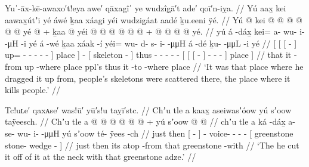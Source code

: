 \ex\label{ex:91-174-skeletons-scattered}%
%
\begingl
	\glpreamble	Yuˈ-āx-kē-awaxo′t!eya awe′ qāxagîˈ ye wudzîg̣ā′t ade′ qoī′n-iỵa. //
	\glpreamble	Yú aax̱ kei aawax̱útʼi yé áwé ḵaa xáagi yéi wudzig̱áat aadé ḵu.eeni ÿé. //
	\gla	{} Yú {} {}  @ {} {}
			kei @  @ {} @ {} @ {} @ {} @ {} {}
			yé {}  @ {} +
		{} ḵaa  @ {} {}
		yéi @  @ {} @ {} @ {} @ {} @ {} +
		{} {} {}  @ {} {}
			 @ {} @ {} @ {} {} yé. {} //
	\glb	{} yú {} {} á -dáx̱ {}
			kei= a- wu- i-  -μH -i {}
			yé {} á -wé
		{} ḵaa xáak -í {}
		yéi= wu- d- s- i-  -μμH
		{} {} {} á -dé {}
			ḵu-  -μμL\hspace{1.25em} -i {} yé {} //
	\glc	{}[  {}[ {}[  - {}]
			up= - - -  - - {}]
			place {}]  -
		{}[  skeleton - {}]
		thus - - - -  -
		{}[ {}[ {}[  - {}]
			-  - - {}] place {}] //
	\gld	{} that {} {} it -from {}
			up  {} {} {} {} -where {}
			place {}  {}
		{} ppl’s  {} {}
		thus  {} {} {} {} {}
		{} {} {} it -to {}
			 {} {} -where {} place {} //
	\glft	‘It was that place where he dragged it up from, people’s skeletons were scattered there, the place where it kills people.’
		//
\endgl
\xe

\ex\label{ex:91-175-cut-at-neck-with-greenstone-adze}%
%
\begingl
	\glpreamble	Tc!uʟe′ qaxᴀse′ was!ū′ yū′s!u taỵī′stc. //
	\glpreamble	Chʼu tle a kaax̱ aseiwasʼóow yú sʼoow taÿeesch. //
	\gla	Chʼu tle {} a  @ {} {}
		 @ {} @ {} @ {} @ {} @ {} +
		{} yú sʼoow  @ {} @ {} {} //
	\glb	chʼu tle {} a ká -dáx̱ {}
		a- se- wu- i-  -μμH
		{} yú sʼoow té- ÿees -ch {} //
	\glc	just then {}[   - {}]
		- voice- - -  -
		{}[  greenstone stone- wedge - {}] //
	\gld	just then {} its atop -from {}
		 {} {} {} {} {}
		{} that greenstone  {} -with {} //
	\glft	‘The he cut it off of it at the neck with that greenstone adze.’
		//
\endgl
\xe

